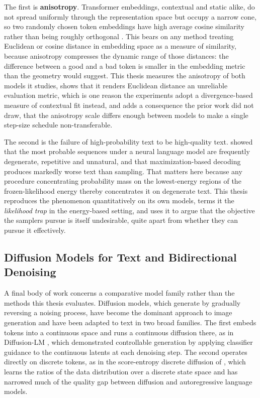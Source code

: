 The first is \textbf{anisotropy}. Transformer embeddings, contextual and static alike, do not spread uniformly through the representation space but occupy a narrow cone, so two randomly chosen token embeddings have high average cosine similarity rather than being roughly orthogonal \citep{gao2019representation, ethayarajh2019contextual}. This bears on any method treating Euclidean or cosine distance in embedding space as a measure of similarity, because anisotropy compresses the dynamic range of those distances: the difference between a good and a bad token is smaller in the embedding metric than the geometry would suggest. This thesis measures the anisotropy of both models it studies, shows that it renders Euclidean distance an unreliable evaluation metric, which is one reason the experiments adopt a divergence-based measure of contextual fit instead, and adds a consequence the prior work did not draw, that the anisotropy scale differs enough between models to make a single step-size schedule non-transferable.

The second is the failure of high-probability text to be high-quality text. \citet{holtzman2020curious} showed that the most probable sequences under a neural language model are frequently degenerate, repetitive and unnatural, and that maximization-based decoding produces markedly worse text than sampling. That matters here because any procedure concentrating probability mass on the lowest-energy regions of the frozen-likelihood energy thereby concentrates it on degenerate text. This thesis reproduces the phenomenon quantitatively on its own models, terms it the \emph{likelihood trap} in the energy-based setting, and uses it to argue that the objective the samplers pursue is itself undesirable, quite apart from whether they can pursue it effectively.

\subsection{Diffusion Models for Text and Bidirectional Denoising}
\label{sec:rel-diffusion}

A final body of work concerns a comparative model family rather than the methods this thesis evaluates. Diffusion models, which generate by gradually reversing a noising process, have become the dominant approach to image generation and have been adapted to text in two broad families. The first embeds tokens into a continuous space and runs a continuous diffusion there, as in Diffusion-LM \citep{li2022diffusion}, which demonstrated controllable generation by applying classifier guidance to the continuous latents at each denoising step. The second operates directly on discrete tokens, as in the score-entropy discrete diffusion of \citet{lou2024discrete}, which learns the ratios of the data distribution over a discrete state space and has narrowed much of the quality gap between diffusion and autoregressive language models.

